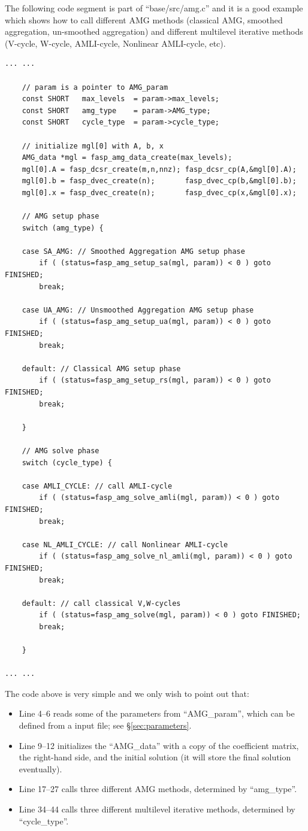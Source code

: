 \documentclass[11pt]{memoir}
\begin{document}
The following code segment is part of ``base/src/amg.c'' and it is a good example which shows how to call different AMG methods (classical AMG, smoothed aggregation, un-smoothed aggregation) and different multilevel iterative methods (V-cycle, W-cycle, AMLI-cycle, Nonlinear AMLI-cycle, etc).
%
\begin{lstlisting}
... ...

    // param is a pointer to AMG_param
    const SHORT   max_levels  = param->max_levels;
    const SHORT   amg_type    = param->AMG_type;
    const SHORT   cycle_type  = param->cycle_type;

    // initialize mgl[0] with A, b, x
    AMG_data *mgl = fasp_amg_data_create(max_levels);
    mgl[0].A = fasp_dcsr_create(m,n,nnz); fasp_dcsr_cp(A,&mgl[0].A);
    mgl[0].b = fasp_dvec_create(n);       fasp_dvec_cp(b,&mgl[0].b);
    mgl[0].x = fasp_dvec_create(n);       fasp_dvec_cp(x,&mgl[0].x);

    // AMG setup phase
    switch (amg_type) {

    case SA_AMG: // Smoothed Aggregation AMG setup phase
        if ( (status=fasp_amg_setup_sa(mgl, param)) < 0 ) goto FINISHED;
        break;

    case UA_AMG: // Unsmoothed Aggregation AMG setup phase
        if ( (status=fasp_amg_setup_ua(mgl, param)) < 0 ) goto FINISHED;
        break;

    default: // Classical AMG setup phase
        if ( (status=fasp_amg_setup_rs(mgl, param)) < 0 ) goto FINISHED;
        break;

    }

    // AMG solve phase
    switch (cycle_type) {

    case AMLI_CYCLE: // call AMLI-cycle
        if ( (status=fasp_amg_solve_amli(mgl, param)) < 0 ) goto FINISHED;
        break;

    case NL_AMLI_CYCLE: // call Nonlinear AMLI-cycle
        if ( (status=fasp_amg_solve_nl_amli(mgl, param)) < 0 ) goto FINISHED;
        break;

    default: // call classical V,W-cycles
        if ( (status=fasp_amg_solve(mgl, param)) < 0 ) goto FINISHED;
        break;

    }

... ...
\end{lstlisting}
%
The code above is very simple and we only wish to point out that:
%
\begin{itemize}
\item Line 4--6 reads some of the parameters from ``AMG\_param'', which can be defined from a input file; see \S\ref{sec:parameters}.
\item Line 9--12 initializes the ``AMG\_data'' with a copy of the coefficient matrix, the right-hand side, and the initial solution (it will store the final solution eventually).
\item Line 17--27 calls three different AMG methods, determined by ``amg\_type''.
\item Line 34--44 calls three different multilevel iterative methods, determined by ``cycle\_type''.
\end{itemize}
\end{document}
